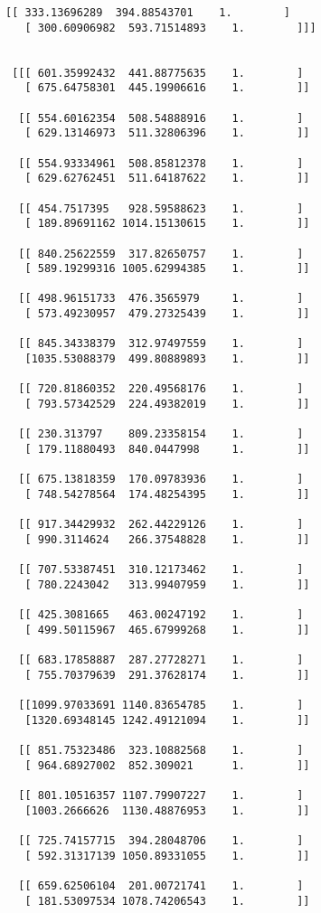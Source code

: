 \documentclass[11pt]{article}
\begin{document}
\begin{Verbatim}[commandchars=\\\{\}]
  [[ 333.13696289  394.88543701    1.        ]
   [ 300.60906982  593.71514893    1.        ]]]


 [[[ 601.35992432  441.88775635    1.        ]
   [ 675.64758301  445.19906616    1.        ]]

  [[ 554.60162354  508.54888916    1.        ]
   [ 629.13146973  511.32806396    1.        ]]

  [[ 554.93334961  508.85812378    1.        ]
   [ 629.62762451  511.64187622    1.        ]]

  [[ 454.7517395   928.59588623    1.        ]
   [ 189.89691162 1014.15130615    1.        ]]

  [[ 840.25622559  317.82650757    1.        ]
   [ 589.19299316 1005.62994385    1.        ]]

  [[ 498.96151733  476.3565979     1.        ]
   [ 573.49230957  479.27325439    1.        ]]

  [[ 845.34338379  312.97497559    1.        ]
   [1035.53088379  499.80889893    1.        ]]

  [[ 720.81860352  220.49568176    1.        ]
   [ 793.57342529  224.49382019    1.        ]]

  [[ 230.313797    809.23358154    1.        ]
   [ 179.11880493  840.0447998     1.        ]]

  [[ 675.13818359  170.09783936    1.        ]
   [ 748.54278564  174.48254395    1.        ]]

  [[ 917.34429932  262.44229126    1.        ]
   [ 990.3114624   266.37548828    1.        ]]

  [[ 707.53387451  310.12173462    1.        ]
   [ 780.2243042   313.99407959    1.        ]]

  [[ 425.3081665   463.00247192    1.        ]
   [ 499.50115967  465.67999268    1.        ]]

  [[ 683.17858887  287.27728271    1.        ]
   [ 755.70379639  291.37628174    1.        ]]

  [[1099.97033691 1140.83654785    1.        ]
   [1320.69348145 1242.49121094    1.        ]]

  [[ 851.75323486  323.10882568    1.        ]
   [ 964.68927002  852.309021      1.        ]]

  [[ 801.10516357 1107.79907227    1.        ]
   [1003.2666626  1130.48876953    1.        ]]

  [[ 725.74157715  394.28048706    1.        ]
   [ 592.31317139 1050.89331055    1.        ]]

  [[ 659.62506104  201.00721741    1.        ]
   [ 181.53097534 1078.74206543    1.        ]]


\end{Verbatim}
\end{document}
